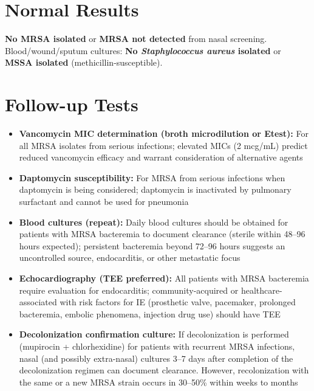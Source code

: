 \section*{Normal Results}
\textbf{No MRSA isolated} or \textbf{MRSA not detected} from nasal screening. Blood/wound/sputum cultures: \textbf{No \textit{Staphylococcus aureus} isolated} or \textbf{MSSA isolated} (methicillin-susceptible).

\section*{Follow-up Tests}
\begin{itemize}
  \item \textbf{Vancomycin MIC determination (broth microdilution or Etest):} For all MRSA isolates from serious infections; elevated MICs (2 mcg/mL) predict reduced vancomycin efficacy and warrant consideration of alternative agents
  \item \textbf{Daptomycin susceptibility:} For MRSA from serious infections when daptomycin is being considered; daptomycin is inactivated by pulmonary surfactant and cannot be used for pneumonia
  \item \textbf{Blood cultures (repeat):} Daily blood cultures should be obtained for patients with MRSA bacteremia to document clearance (sterile within 48--96 hours expected); persistent bacteremia beyond 72--96 hours suggests an uncontrolled source, endocarditis, or other metastatic focus
  \item \textbf{Echocardiography (TEE preferred):} All patients with MRSA bacteremia require evaluation for endocarditis; community-acquired or healthcare-associated with risk factors for IE (prosthetic valve, pacemaker, prolonged bacteremia, embolic phenomena, injection drug use) should have TEE
  \item \textbf{Decolonization confirmation culture:} If decolonization is performed (mupirocin + chlorhexidine) for patients with recurrent MRSA infections, nasal (and possibly extra-nasal) cultures 3--7 days after completion of the decolonization regimen can document clearance. However, recolonization with the same or a new MRSA strain occurs in 30--50\% within weeks to months
\end{itemize}

